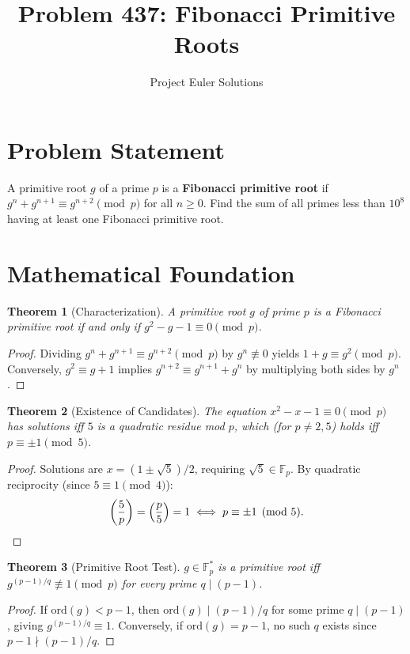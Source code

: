 \documentclass[11pt]{article}
\title{Problem 437: Fibonacci Primitive Roots}
\author{Project Euler Solutions}
\date{}
\newtheorem{theorem}{Theorem}
\begin{document}
\maketitle

\section{Problem Statement}
A primitive root $g$ of a prime $p$ is a \textbf{Fibonacci primitive root} if $g^n + g^{n+1} \equiv g^{n+2} \pmod{p}$ for all $n \geq 0$. Find the sum of all primes less than $10^8$ having at least one Fibonacci primitive root.

\section{Mathematical Foundation}

\begin{theorem}[Characterization]
A primitive root $g$ of prime $p$ is a Fibonacci primitive root if and only if $g^2 - g - 1 \equiv 0 \pmod{p}$.
\end{theorem}

\begin{proof}
Dividing $g^n + g^{n+1} \equiv g^{n+2} \pmod{p}$ by $g^n \not\equiv 0$ yields $1 + g \equiv g^2 \pmod{p}$. Conversely, $g^2 \equiv g + 1$ implies $g^{n+2} \equiv g^{n+1} + g^n$ by multiplying both sides by $g^n$.
\end{proof}

\begin{theorem}[Existence of Candidates]
The equation $x^2 - x - 1 \equiv 0 \pmod{p}$ has solutions iff $5$ is a quadratic residue mod $p$, which (for $p \neq 2, 5$) holds iff $p \equiv \pm 1 \pmod{5}$.
\end{theorem}

\begin{proof}
Solutions are $x = (1 \pm \sqrt{5})/2$, requiring $\sqrt{5} \in \mathbb{F}_p$. By quadratic reciprocity (since $5 \equiv 1 \pmod{4}$):
\[
\left(\frac{5}{p}\right) = \left(\frac{p}{5}\right) = 1 \iff p \equiv \pm 1 \pmod{5}. \qedhere
\]
\end{proof}

\begin{theorem}[Primitive Root Test]
$g \in \mathbb{F}_p^*$ is a primitive root iff $g^{(p-1)/q} \not\equiv 1 \pmod{p}$ for every prime $q \mid (p-1)$.
\end{theorem}

\begin{proof}
If $\mathrm{ord}(g) < p - 1$, then $\mathrm{ord}(g) \mid (p-1)/q$ for some prime $q \mid (p-1)$, giving $g^{(p-1)/q} \equiv 1$. Conversely, if $\mathrm{ord}(g) = p - 1$, no such $q$ exists since $p - 1 \nmid (p-1)/q$.
\end{proof}
\end{document}
